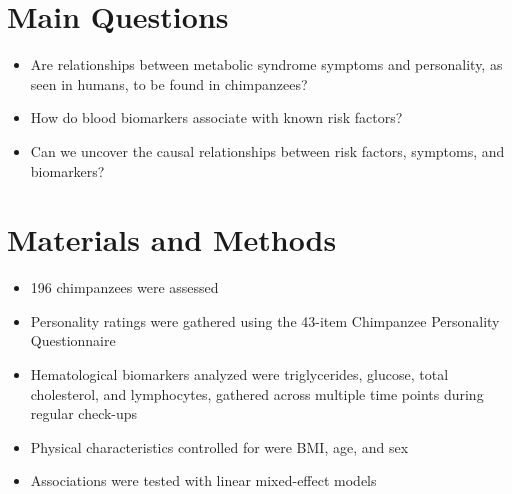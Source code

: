\documentclass[a0,landscape]{a0poster}
\begin{document}



\color{NavyBlue}
\section*{Main Questions}

\begin{itemize}
\item Are relationships between metabolic syndrome symptoms and personality, as seen in humans, to be found in chimpanzees?
\item How do blood biomarkers associate with known risk factors?
\item Can we uncover the causal relationships between risk factors, symptoms, and biomarkers?
\end{itemize}


\color{Maroon}
\section*{Materials and Methods}

\begin{itemize}
\item 196 chimpanzees were assessed 
\item Personality ratings were gathered using the 43-item Chimpanzee Personality Questionnaire
\item Hematological biomarkers analyzed were triglycerides, glucose, total cholesterol, and lymphocytes, gathered across multiple time points during regular check-ups
\item Physical characteristics controlled for were BMI, age, and sex
\item Associations were tested with linear mixed-effect models
\end{itemize}
\end{document}
